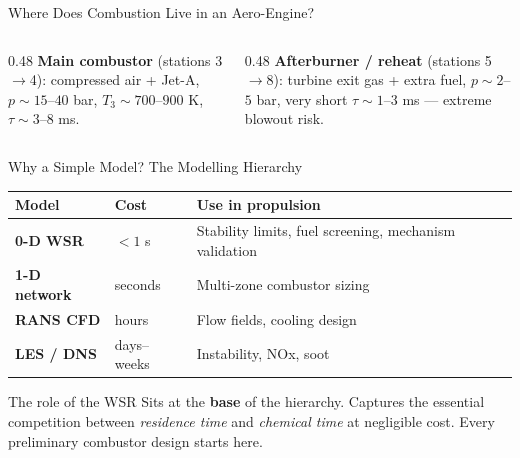 \documentclass[12pt,aspectratio=169]{beamer}
\newcommand{\taures}{\tau}
\begin{document}
\begin{frame}{Where Does Combustion Live in an Aero-Engine?}
\begin{center}
  \end{center}

  \medskip
  \begin{columns}
    \begin{column}{0.48\textwidth}
      \textbf{Main combustor} (stations 3$\to$4):
      compressed air + Jet-A, $p\sim15$--$40$ bar, $T_3\sim700$--$900$ K,
      $\taures \sim 3$--$8$ ms.
    \end{column}
    \begin{column}{0.48\textwidth}
      \textbf{Afterburner / reheat} (stations 5$\to$8):
      turbine exit gas + extra fuel, $p\sim2$--$5$ bar, very short
      $\taures \sim 1$--$3$ ms --- extreme blowout risk.
    \end{column}
  \end{columns}
\end{frame}

\begin{frame}{Why a Simple Model? The Modelling Hierarchy}

  \begin{center}
  \renewcommand{\arraystretch}{1.35}
  \begin{tabular}{>{\bfseries}p{3.5cm} p{4.0cm} p{4.0cm}}
    \toprule
    Model & Cost & Use in propulsion \\
    \midrule
    \alert{0-D WSR} & $< 1$ s & Stability limits, fuel screening,
                                  mechanism validation \\
    1-D network     & seconds  & Multi-zone combustor sizing \\
    RANS CFD        & hours    & Flow fields, cooling design \\
    LES / DNS       & days--weeks & Instability, NOx, soot \\
    \bottomrule
  \end{tabular}
  \end{center}

  \medskip
  \begin{block}{The role of the WSR}
    Sits at the \textbf{base} of the hierarchy.
    Captures the essential competition between \emph{residence time} and
    \emph{chemical time} at negligible cost.
    Every preliminary combustor design starts here.
  \end{block}
\end{frame}
\end{document}
